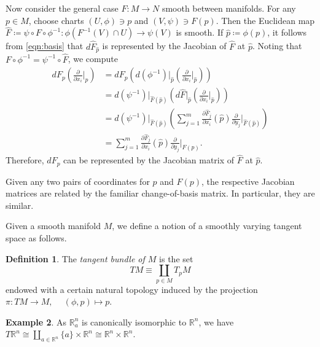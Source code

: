 \documentclass[10pt,letterpaper,cm]{nupset}
\theoremstyle{definition}
\newtheorem{definition}{Definition}[subsection]
\newtheorem{exmp}[definition]{Example}
\theoremstyle{theorem}
\theoremstyle{remark}
\newcommand{\R}{\mathbb R}
\newcommand{\1}{\mathbf{1}}
\newcommand{\0}{\vec 0}
\begin{document}
Now consider the general case $F: M \to N$ smooth between manifolds. For any $p \in M$, choose charts $(U, \phi) \ni p$ and $(V, \psi) \ni F(p)$. Then the Euclidean map $\widehat{F}\coloneqq  \psi \circ F \circ \phi^{-1} : \phi(F^{-1}(V) \cap U) \to \psi(V)$ is smooth. If $\hat{p}\coloneqq  \phi(p)$, it follows from \eqref{eqn:basis} that $d\widehat{F}_{\hat{p}}$ is represented by the Jacobian of $\widehat{F}$ at $\hat{p}$. Noting that $F \circ \phi^{-1} = \psi^{-1} \circ \widehat{F}$, we compute
\begin{align*}
dF_p\left(\frac{\partial}{\partial{x_i}}\bigr\rvert_p\right) 
 & =  dF_p\left(d(\phi^{-1})\bigr\rvert_{\hat{p}}\left(\frac{\partial}{\partial{x_i}}\bigr\rvert_{\hat{p}}\right)\right) 
\\ & = d(\psi^{-1})\bigr\rvert_{\widehat{F}(\hat{p})}\left(d\widehat{F}\bigr\rvert_{\hat{p}}\left(\frac{\partial}{\partial{x_i}}\bigr\rvert_{\hat{p}}\right)\right)
\\ & = d(\psi^{-1})\bigr\rvert_{\widehat{F}(\hat{p})}\left(\sum_{j=1}^m \frac{\partial{\widehat{F}_j}}{\partial{x_i}}(\hat{p})\frac{\partial}{\partial{y_j}}\bigr\rvert_{\widehat{F}(\hat{p})}\right) 
\\ & = 
\sum_{j=1}^m \frac{\partial{\widehat{F}_j}}{\partial{x_i}}(\hat{p})\frac{\partial}{\partial{y_j}}\bigr\rvert_{F(p)}.
\end{align*}
Therefore, $dF_p$ can be represented by the Jacobian matrix of $\widehat{F}$ at $\hat{p}$. 

\smallskip

Given any two pairs of coordinates for $p$ and $F(p)$, the respective Jacobian matrices are related by the familiar change-of-basis matrix. In particular, they are similar.

\bigskip

Given a smooth manifold $M$, we define a notion of a smoothly varying tangent space as follows. 

\begin{definition}
 The \textit{tangent bundle of $M$} is the set  $$TM \equiv \coprod_{p \in M} T_pM$$ endowed with a certain natural topology induced by the projection $\pi: TM \to M, \ \quad (\phi, p) \mapsto p$.
 \end{definition}

\begin{exmp}
As $\R_a^n$ is canonically isomorphic to $\R^n$, we have $T\R^n \cong \coprod_{a\in \R^n} \{a\} \times \R^n \cong \R^n \times \R^n$.
\end{exmp}
\end{document}
